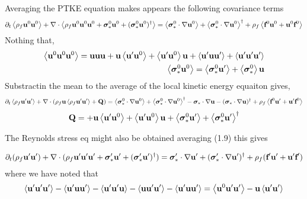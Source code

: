 Averaging the PTKE equation makes appears the following covariance terms
\begin{multline}
    \partial_t\left<\rho_f\textbf{u}^0\textbf{u}^0\right>
    + \mathbf{\nabla}\cdot \left<\rho_f \textbf{u}^0\textbf{u}^0\textbf{u}^0 + \bm\sigma^0_*\textbf{u}^0 + (\bm\sigma_*^0 \textbf{u}^0 )^\dagger \right>
    = 
    \left<\bm\sigma_*^0 \cdot \mathbf{\nabla} \textbf{u}^0\right>
    +\left<\bm\sigma_*^0 \cdot \mathbf{\nabla} \textbf{u}^0\right>^\dagger
    + \rho_f \left<\textbf{f}^0 \textbf{u}^0 + \textbf{u}^0 \textbf{f}^0\right>
\end{multline}
Nothing that,
\begin{align*}
    \left< \textbf{u}^0\textbf{u}^0\textbf{u}^0 \right>
    =
    \textbf{u}\textbf{u}\textbf{u}
    + \textbf{u}\left< \textbf{u}'\textbf{u}^0 \right>
    + \left< \textbf{u}'\textbf{u}^0 \right>\textbf{u}
    + \left< \textbf{u}'\textbf{u}\textbf{u}' \right>
    + \left< \textbf{u}'\textbf{u}'\textbf{u}' \right>\\
    \left<\bm\sigma_*^0 \textbf{u}^0\right>
    = 
    \left<\bm\sigma_*^0 \textbf{u}'\right>
    + \left<\bm\sigma_*^0 \right>\textbf{u}
\end{align*}
Substractin the mean to the average of the local kinetic energy equaiton gives, 
\begin{multline}
    \partial_t\left<\rho_f\textbf{u}'\textbf{u}'\right>
    + \mathbf{\nabla}\cdot (\rho_f \textbf{u}\left<\rho_f \textbf{u}'\textbf{u}'\right> + \textbf{Q})
    = 
    \left<\bm\sigma_*^0 \cdot \mathbf{\nabla} \textbf{u}^0\right>
    +\left<\bm\sigma_*^0 \cdot \mathbf{\nabla} \textbf{u}^0\right>^\dagger
    - \bm\sigma_*\cdot \mathbf{\nabla} \textbf{u}
    - (\bm\sigma_*\cdot \mathbf{\nabla} \textbf{u})^\dagger
    + \rho_f \left<\textbf{f}^0 \textbf{u}' + \textbf{u}' \textbf{f}^0\right>
\end{multline}
\begin{equation}
    \textbf{Q}
    =
    + \textbf{u}\left< \textbf{u}'\textbf{u}^0 \right>
    + \left< \textbf{u}'\textbf{u}^0 \right>\textbf{u}
    + \left<\bm\sigma_*^0 \textbf{u}'\right>
    + \left<\bm\sigma_*^0 \textbf{u}'\right>^\dagger
\end{equation}


The Reynolds stress eq might also be obtained averaging (1.9) this gives 

\begin{multline}
    \partial_t(\rho_f\textbf{u}'\textbf{u}') + \mathbf{\nabla}\cdot (\rho_f \textbf{u}'\textbf{u}'\textbf{u}' + \bm\sigma'_*\textbf{u}' + (\bm\sigma_*' \textbf{u}' )^\dagger )
    = 
    \bm\sigma_*' \cdot \mathbf{\nabla} \textbf{u}'
    +(\bm\sigma_*' \cdot \mathbf{\nabla} \textbf{u}')^\dagger
    + \rho_f (\textbf{f}' \textbf{u}' + \textbf{u}' \textbf{f}')
\end{multline}
where we have noted that 
\begin{equation}
\left<\textbf{u}'\textbf{u}'\textbf{u}'\right>    
- \left<\textbf{u}'\textbf{uu}'\right>
- \left<\textbf{u}'\textbf{u}' \textbf{u}\right>
- \left<\textbf{uu}'\textbf{u}'\right>
- \left<\textbf{u}' \textbf{u}\textbf{u}'\right>
=
\left<\textbf{u}^0\textbf{u}'\textbf{u}'\right>    
- \textbf{u} \left<\textbf{u}'\textbf{u}'\right>    
\end{equation}
